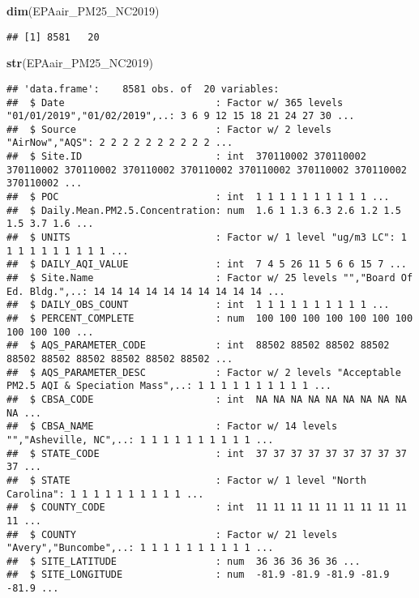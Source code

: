 \documentclass[]{article}
\newenvironment{Shaded}{\begin{snugshade}}{\end{snugshade}}
\newcommand{\KeywordTok}[1]{\textcolor[rgb]{0.13,0.29,0.53}{\textbf{#1}}}
\newcommand{\NormalTok}[1]{#1}
\begin{document}
\begin{Shaded}
\begin{Highlighting}[]
\KeywordTok{dim}\NormalTok{(EPAair_PM25_NC2019)}
\end{Highlighting}
\end{Shaded}

\begin{verbatim}
## [1] 8581   20
\end{verbatim}

\begin{Shaded}
\begin{Highlighting}[]
\KeywordTok{str}\NormalTok{(EPAair_PM25_NC2019)}
\end{Highlighting}
\end{Shaded}

\begin{verbatim}
## 'data.frame':    8581 obs. of  20 variables:
##  $ Date                          : Factor w/ 365 levels "01/01/2019","01/02/2019",..: 3 6 9 12 15 18 21 24 27 30 ...
##  $ Source                        : Factor w/ 2 levels "AirNow","AQS": 2 2 2 2 2 2 2 2 2 2 ...
##  $ Site.ID                       : int  370110002 370110002 370110002 370110002 370110002 370110002 370110002 370110002 370110002 370110002 ...
##  $ POC                           : int  1 1 1 1 1 1 1 1 1 1 ...
##  $ Daily.Mean.PM2.5.Concentration: num  1.6 1 1.3 6.3 2.6 1.2 1.5 1.5 3.7 1.6 ...
##  $ UNITS                         : Factor w/ 1 level "ug/m3 LC": 1 1 1 1 1 1 1 1 1 1 ...
##  $ DAILY_AQI_VALUE               : int  7 4 5 26 11 5 6 6 15 7 ...
##  $ Site.Name                     : Factor w/ 25 levels "","Board Of Ed. Bldg.",..: 14 14 14 14 14 14 14 14 14 14 ...
##  $ DAILY_OBS_COUNT               : int  1 1 1 1 1 1 1 1 1 1 ...
##  $ PERCENT_COMPLETE              : num  100 100 100 100 100 100 100 100 100 100 ...
##  $ AQS_PARAMETER_CODE            : int  88502 88502 88502 88502 88502 88502 88502 88502 88502 88502 ...
##  $ AQS_PARAMETER_DESC            : Factor w/ 2 levels "Acceptable PM2.5 AQI & Speciation Mass",..: 1 1 1 1 1 1 1 1 1 1 ...
##  $ CBSA_CODE                     : int  NA NA NA NA NA NA NA NA NA NA ...
##  $ CBSA_NAME                     : Factor w/ 14 levels "","Asheville, NC",..: 1 1 1 1 1 1 1 1 1 1 ...
##  $ STATE_CODE                    : int  37 37 37 37 37 37 37 37 37 37 ...
##  $ STATE                         : Factor w/ 1 level "North Carolina": 1 1 1 1 1 1 1 1 1 1 ...
##  $ COUNTY_CODE                   : int  11 11 11 11 11 11 11 11 11 11 ...
##  $ COUNTY                        : Factor w/ 21 levels "Avery","Buncombe",..: 1 1 1 1 1 1 1 1 1 1 ...
##  $ SITE_LATITUDE                 : num  36 36 36 36 36 ...
##  $ SITE_LONGITUDE                : num  -81.9 -81.9 -81.9 -81.9 -81.9 ...
\end{verbatim}
\end{document}
